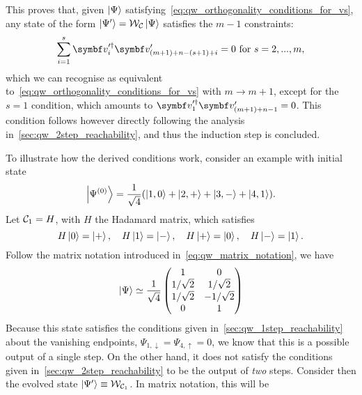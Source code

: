 This proves that, given $\ket\Psi$ satisfying~\cref{eq:qw_orthogonality_conditions_for_vs}, any state of the form $\ket{\Psi'}={\mathcal{W}}_{\mathcal{C}}\ket\Psi$ satisfies the $m-1$ constraints:
\begin{equation}
    \sum_{i=1}^{s} \bs v^{\prime\dagger}_i \bs v^\prime_{(m+1)+n-(s+1)+i}=0
	\text{ for }
	s = 2,...,m,
	\label{eq:qw_general_orthogonality_almost_finished}
\end{equation}
which we can recognise as equivalent to~\cref{eq:qw_orthogonality_conditions_for_vs} with $m\to m+1$, except for the $s=1$ condition, which amounts to $\bs v_1^{\prime\dagger}\bs v'_{(m+1)+n-1}=0$.
This condition follows however directly following the analysis in~\cref{sec:qw_2step_reachability}, and thus the induction step is concluded.

\begin{example}[label=ex:qw_conditions_few_steps]
    To illustrate how the derived conditions work, consider an example with initial state
    \begin{equation}
        \ket{\Psi^{(0)}} = \frac{1}{\sqrt4} (
        \ket{1,0} + \ket{2,+} + \ket{3, -} + \ket{4, 1}
        ).
    \end{equation}
    Let ${\mathcal{C}}_1=H$, with $H$ the Hadamard matrix, which satisfies
    \begin{equation}
        H\ket0=\ket+, \quad H\ket1=\ket-,
        \quad H\ket+=\ket0, \quad H\ket-=\ket1.
    \end{equation}
    Follow the matrix notation introduced in~\cref{eq:qw_matrix_notation}, we have
    \begin{equation}
        \ket{\Psi} \simeq
        \frac{1}{\sqrt4}
        \begin{pmatrix}
            1 & 0 \\
            1/\sqrt2 & 1/\sqrt2 \\
            1/\sqrt2 & -1/\sqrt2 \\
            0 & 1
        \end{pmatrix}
    \end{equation}
    Because this state satisfies the conditions given in~\cref{sec:qw_1step_reachability} about the vanishing endpoints, $\Psi_{1,\downarrow}=\Psi_{4,\uparrow}=0$, we know that this is a possible output of a single step. On the other hand, it does not satisfy the conditions given in~\cref{sec:qw_2step_reachability} to be the output of \textit{two} steps.
    Consider then the evolved state $\ket{\Psi'}\equiv{\mathcal{W}}_{{\mathcal{C}}_1}$. In matrix notation, this will be
    \begin{equation}

\end{equation}
\end{example}
